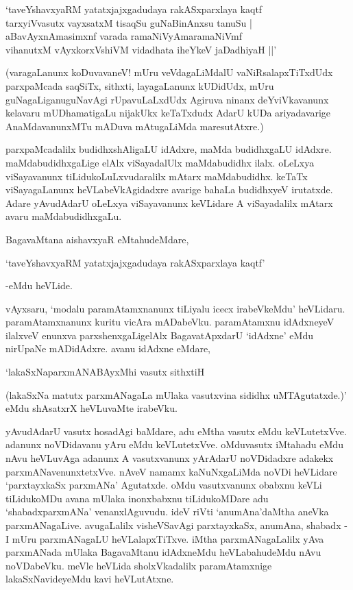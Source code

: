 \begin{shloka}
`taveYshavxyaRM yatatxjajxgadudaya rakASxparxlaya kaqtf\\
tarxyiVvasutx vayxsatxM tisaqSu guNaBinAnxsu tanuSu |\\
aBavAyxnAmasimxnf varada ramaNiVyAmaramaNiVmf\\
vihanutxM vAyxkorxVshiVM vidadhata iheYkeV jaDadhiyaH ||'
\end{shloka}

(varagaLanunx koDuvavaneV! mUru veVdagaLiMdalU vaNiRsalapxTiTxdUdx parxpaMcada saqSiTx, sithxti, layagaLanunx kUDidUdx, mUru guNagaLiganuguNavAgi rUpavuLaLxdUdx Agiruva ninanx deYviVkavanunx kelavaru mUDhamatigaLu nijakUkx keTaTxdudx AdarU kUDa ariyadavarige AnaMdavanunxMTu mADuva mAtugaLiMda maresutAtxre.)

parxpaMcadalilx budidhxshAligaLU idAdxre, maMda budidhxgaLU idAdxre. maMdabudidhxgaLige elAlx viSayadalUlx maMdabudidhx ilalx. oLeLxya viSayavanunx tiLidukoLuLxvudaralilx mAtarx maMdabudidhx. keTaTx viSayagaLanunx heVLabeVkAgidadxre avarige bahaLa budidhxyeV irutatxde. Adare yAvudAdarU oLeLxya viSayavanunx keVLidare A viSayadalilx mAtarx avaru maMdabudidhxgaLu.

BagavaMtana aishavxyaR eMtahudeMdare,

\begin{shloka}
`taveYshavxyaRM yatatxjajxgadudaya rakASxparxlaya kaqtf'
\end{shloka}

-eMdu heVLide.

vAyxsaru, `modalu paramAtamxnanunx tiLiyalu icecx irabeVkeMdu' heVLidaru. paramAtamxnanunx kuritu vicAra mADabeVku. paramAtamxnu idAdxneyeV ilalxveV enunxva parxshenxgaLigelAlx BagavatApxdarU `idAdxne' eMdu nirUpaNe mADidAdxre. avanu idAdxne eMdare,

\begin{shloka}
`lakaSxNaparxmANABAyxMhi vasutx sithxtiH
\end{shloka}

(lakaSxNa matutx parxmANagaLa mUlaka vasutxvina sididhx uMTAgutatxde.)' eMdu shAsatxrX heVLuvaMte irabeVku.

yAvudAdarU vasutx hosadAgi baMdare, adu eMtha vasutx eMdu keVLutetxVve. adanunx noVDidavanu yAru eMdu keVLutetxVve. oMdu\break vasutx iMtahadu eMdu nAvu heVLuvAga adanunx A vasutxvanunx yArAdarU noVDidadxre adakekx parxmANavenunxtetxVve. nAveV namamx kaNuNxgaLiMda noVDi heVLi\-dare `parxtayxkaSx parxmANa' Agutatxde. oMdu vasutxvanunx obabxnu keVLi tiLidukoMDu avana mUlaka inonxbabxnu tiLidukoMDare adu `shabadxparxmANa' venanxlAguvudu. ideV riVti `anumAna'daMtha aneVka parxmANagaLive. avugaLalilx visheVSavAgi parxtayxkaSx, anumAna, shabadx - I mUru parxmANagaLU heVLalapxTiTxve. iMtha parxmANagaLalilx yAva parxmANada mUlaka BagavaMtanu idAdxneMdu heVLabahudeMdu nAvu noVDabeVku. meVle heVLida sholxVkadalilx paramAtamxnige lakaSxNavideyeMdu kavi heVLutAtxne.


